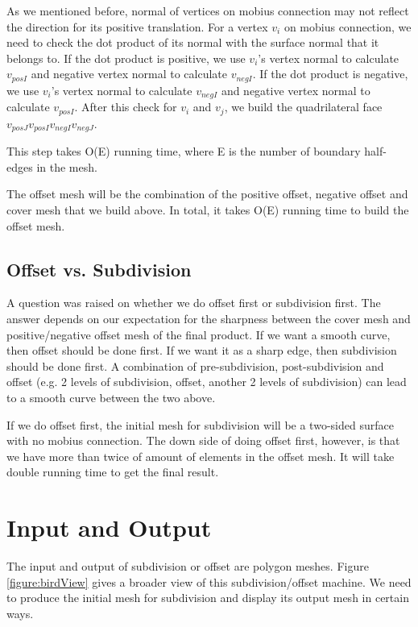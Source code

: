 \documentclass[12pt]{article}
\begin{document}
As we mentioned before, normal of vertices on mobius connection may not reflect the direction for its positive translation. For a vertex $v_i$ on mobius connection, we need to check the dot product of its normal with the surface normal that it belongs to. If the dot product is positive, we use $v_i$'s vertex normal to calculate $v_{posI}$ and negative vertex normal to calculate $v_{negI}$. If the dot product is negative, we use $v_i$'s vertex normal to calculate $v_{negI}$ and negative vertex normal to calculate $v_{posI}$. After this check for $v_i$ and $v_j$, we build the quadrilateral face $v_{posJ}v_{posI}v_{negI}v_{negJ}$.

This step takes O(E) running time, where E is the number of boundary half-edges in the mesh.

The offset mesh will be the combination of the positive offset, negative offset and cover mesh that we build above. In total, it takes O(E) running time to build the offset mesh.

\subsection{Offset vs. Subdivision}
A question was raised on whether we do offset first or subdivision first. The answer depends on our expectation for the sharpness between the cover mesh and positive/negative offset mesh of the final product. If we want a smooth curve, then offset should be done first. If we want it as a sharp edge, then subdivision should be done first. A combination of pre-subdivision, post-subdivision and offset (e.g. 2 levels of subdivision, offset, another 2 levels of subdivision) can lead to a smooth curve between the two above.

If we do offset first, the initial mesh for subdivision will be a two-sided surface with no mobius connection. The down side of doing offset first, however, is that we have more than twice of amount of elements in the offset mesh. It will take double running time to get the final result.

\newpage
\section{Input and Output}
The input and output of subdivision or offset are polygon meshes. Figure \ref{figure:birdView} gives a broader view of this subdivision/offset machine. We need to produce the initial mesh for subdivision and display its output mesh in certain ways.
\end{document}
